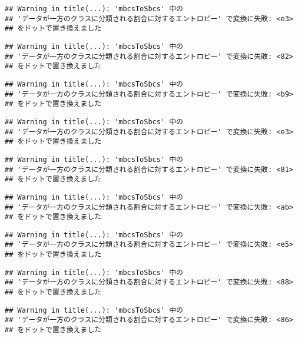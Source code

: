 \documentclass[
]{article}
\begin{document}
\begin{verbatim}
## Warning in title(...): 'mbcsToSbcs' 中の
## 'データが一方のクラスに分類される割合に対するエントロピー' で変換に失敗: <e3>
## をドットで置き換えました
\end{verbatim}

\begin{verbatim}
## Warning in title(...): 'mbcsToSbcs' 中の
## 'データが一方のクラスに分類される割合に対するエントロピー' で変換に失敗: <82>
## をドットで置き換えました
\end{verbatim}

\begin{verbatim}
## Warning in title(...): 'mbcsToSbcs' 中の
## 'データが一方のクラスに分類される割合に対するエントロピー' で変換に失敗: <b9>
## をドットで置き換えました
\end{verbatim}

\begin{verbatim}
## Warning in title(...): 'mbcsToSbcs' 中の
## 'データが一方のクラスに分類される割合に対するエントロピー' で変換に失敗: <e3>
## をドットで置き換えました
\end{verbatim}

\begin{verbatim}
## Warning in title(...): 'mbcsToSbcs' 中の
## 'データが一方のクラスに分類される割合に対するエントロピー' で変換に失敗: <81>
## をドットで置き換えました
\end{verbatim}

\begin{verbatim}
## Warning in title(...): 'mbcsToSbcs' 中の
## 'データが一方のクラスに分類される割合に対するエントロピー' で変換に失敗: <ab>
## をドットで置き換えました
\end{verbatim}

\begin{verbatim}
## Warning in title(...): 'mbcsToSbcs' 中の
## 'データが一方のクラスに分類される割合に対するエントロピー' で変換に失敗: <e5>
## をドットで置き換えました
\end{verbatim}

\begin{verbatim}
## Warning in title(...): 'mbcsToSbcs' 中の
## 'データが一方のクラスに分類される割合に対するエントロピー' で変換に失敗: <88>
## をドットで置き換えました
\end{verbatim}

\begin{verbatim}
## Warning in title(...): 'mbcsToSbcs' 中の
## 'データが一方のクラスに分類される割合に対するエントロピー' で変換に失敗: <86>
## をドットで置き換えました
\end{verbatim}
\end{document}

